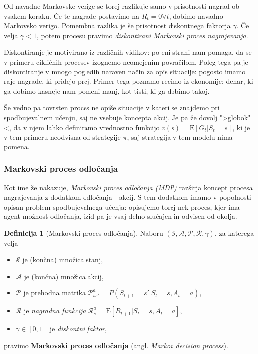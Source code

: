 \documentclass[12pt,a4paper]{amsart}
\theoremstyle{definition} %
\newtheorem{definicija}{Definicija}[section]
\theoremstyle{plain} %
\begin{document}
Od navadne Markovske verige se torej razlikuje samo v prisotnosti nagrad ob vsakem koraku. Če te 
nagrade postavimo na $R_t = 0 \forall t$, dobimo navadno Markovsko verigo. Pomembna razlika je še 
prisotnost diskontnega faktorja $\gamma$. Če velja $\gamma < 1$, potem procesu pravimo \textit{
diskontirani Markovski proces nagrajevanja}.

Diskontiranje je motivirano iz različnih vidikov: po eni strani nam pomaga, da se v primeru 
cikličnih procesov izognemo neomejenim povračilom. Poleg tega pa je diskontiranje v mnogo pogledih 
naraven način za opis situacije: pogosto imamo raje nagrade, ki pridejo prej. Primer tega poznamo 
recimo iz ekonomije; denar, ki ga dobimo kasneje nam pomeni manj, kot tisti, ki ga dobimo takoj. 

Še vedno pa tovrsten proces ne opiše situacije v kateri se znajdemo pri spodbujevalnem učenju, saj 
ne vsebuje koncepta akcij. Je pa že dovolj ">globok"<, da v njem lahko definiramo vrednostno 
funkcijo $v(s) = \mathrm{E} [G_t | S_t = s]$, ki je v tem primeru neodvisna od strategije $\pi$, 
saj strategija v tem modelu nima pomena.

\subsubsection{Markovski proces odločanja}
Kot ime že nakazuje, \textit{Markovski proces odločanja (MDP)} razširja koncept procesa nagrajevanja 
z dodatkom odločanja - akcij. S tem dodatkom imamo v popolnosti opisan problem spodbujevalnega 
učenja: opisujemo torej nek proces, kjer ima agent možnost odločanja, izid pa je vsaj delno slučajen 
in odvisen od okolja. 

\begin{definicija}[Markovski proces odločanja]
    Naboru $(\mathcal{S}, \mathcal{A}, \mathcal{P}, \mathcal{R}, \gamma)$, za katerega velja
    \begin{itemize}
        \item $\mathcal{S}$ je (končna) množica stanj,
        \item $\mathcal{A}$ je (končna) množica akcij, 
        \item $\mathcal{P}$ je prehodna matrika $\mathcal{P}_{ss'}^a = P(S_{t+1} = s' | 
                S_t = s, A_t = a)$, 
        \item $\mathcal{R}$ je \textit{nagradna funkcija} 
                $\mathcal{R}_s^a = \mathrm{E}[R_{t+1} | S_{t} = s, A_t = a]$, 
        \item $\gamma \in [0,1]$ je \textit{diskontni faktor}, 
    \end{itemize}
    pravimo \textbf{Markovski proces odločanja} (angl. \textit{Markov decision process}).
\end{definicija}
\end{document}
